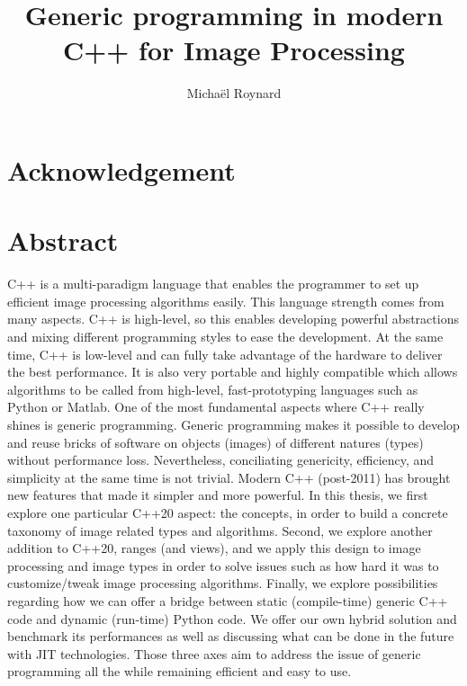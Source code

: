 \documentclass[11pt,a4paper]{book}
\begin{document}
%
\title{Generic programming in modern C++ for Image Processing}


\author{Michaël Roynard}


\maketitle

\section*{Acknowledgement}
\label{sec:acknowledgement}


\section*{Abstract}
\label{sec:abstract}
C++ is a multi-paradigm language that enables the programmer to set up efficient image processing algorithms easily.
This language strength comes from many aspects. C++ is high-level, so this enables developing powerful abstractions and
mixing different programming styles to ease the development. At the same time, C++ is low-level and can fully take
advantage of the hardware to deliver the best performance. It is also very portable and highly compatible which allows
algorithms to be called from high-level, fast-prototyping languages such as Python or Matlab. One of the most
fundamental aspects where C++ really shines is generic programming. Generic programming makes it possible to develop and
reuse bricks of software on objects (images) of different natures (types) without performance loss. Nevertheless,
conciliating genericity, efficiency, and simplicity at the same time is not trivial. Modern C++ (post-2011) has brought
new features that made it simpler and more powerful. In this thesis, we first explore one particular C++20 aspect: the
concepts, in order to build a concrete taxonomy of image related types and algorithms. Second, we explore another
addition to C++20, ranges (and views), and we apply this design to image processing and image types in order to solve
issues such as how hard it was to customize/tweak image processing algorithms. Finally, we explore possibilities
regarding how we can offer a bridge between static (compile-time) generic C++ code and dynamic (run-time) Python code.
We offer our own hybrid solution and benchmark its performances as well as discussing what can be done in the future
with JIT technologies. Those three axes aim to address the issue of generic programming all the while remaining
efficient and easy to use.
\end{document}
